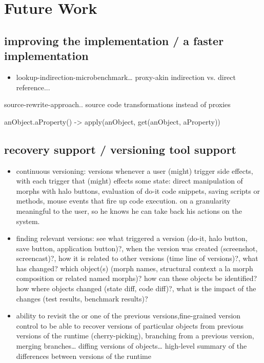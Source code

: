 \chapter{Future Work} \label{sec:FUTURE_WORK}

\section{improving the implementation / a faster implementation}

\begin{itemize}
    \item lookup-indirection-microbenchmark… proxy-akin indirection vs. direct reference...
\end{itemize}

source-rewrite-approach.. source code transformations instead of proxies

anObject.aProperty() -> apply(anObject, get(anObject, aProperty))

\section{recovery support / versioning tool support}

\begin{itemize}
    \item continuous versioning: versions whenever a user (might) trigger side effects, with each trigger that (might) effects some state: direct manipulation of morphs with halo buttons, evaluation of do-it code snippets, saving scripts or methods, mouse events that fire up code execution.
on a granularity meaningful to the user, so he knows he can take back his actions on the system.
    \item finding relevant versions: see what triggered a version (do-it, halo button, save button, application button)?, when the version was created (screenshot, screencast)?, how it is related to other versions (time line of versions)?, what has changed? which object(s) (morph names, structural context a la morph composition or related named morphs)? how can these objects be identified? how where objects changed (state diff, code diff)?, what is the impact of the changes (test results, benchmark results)?
    \item ability to revisit the or one of the previous versions,fine-grained version control to be able to recover versions of particular objects from previous versions of the runtime (cherry-picking), branching from a previous version, merging branches… diffing versions of objects… high-level summary of the differences between versions of the runtime
\end{itemize}
